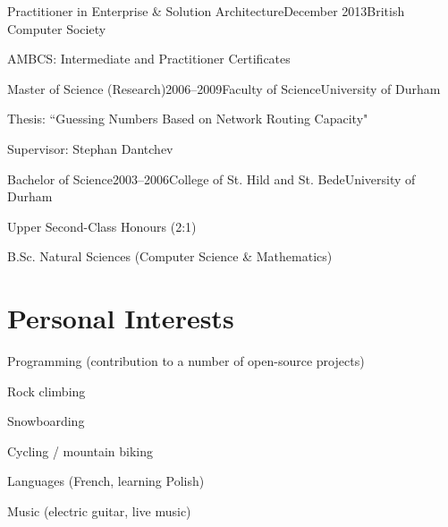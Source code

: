 \documentclass{cv}
\begin{document}
\begin{experience}{Practitioner in Enterprise \& Solution Architecture}{December 2013}{British Computer Society}{}
\item AMBCS: Intermediate and Practitioner Certificates
\end{experience}

\begin{experience}{Master of Science (Research)}{2006--2009}{Faculty of Science}{University of Durham}
\item Thesis: ``Guessing Numbers Based on Network Routing Capacity"
\item Supervisor: Stephan Dantchev
\end{experience}

\begin{experience}{Bachelor of Science}{2003--2006}{College of St. Hild and St. Bede}{University of Durham}
\item Upper Second-Class Honours (2:1)
\item B.Sc. Natural Sciences (Computer Science \& Mathematics)
\end{experience}


\section{Personal Interests}

\begin{experience}{}{}{}{}
\item Programming (contribution to a number of open-source projects)
\item Rock climbing
\item Snowboarding
\item Cycling / mountain biking
\item Languages (French, learning Polish)
\item Music (electric guitar, live music)
\end{experience}
\end{document}

